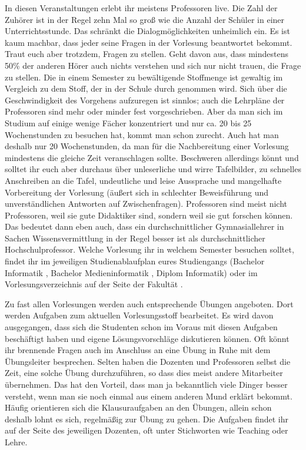 In diesen Veranstaltungen erlebt ihr meistens Professoren live.
Die Zahl der Zuhörer ist in der Regel zehn Mal so groß wie die Anzahl der Schüler in einer Unterrichtsstunde.
Das schränkt die Dialogmöglichkeiten unheimlich ein.
Es ist kaum machbar, dass jeder seine Fragen in der Vorlesung beantwortet bekommt.
Traut euch aber trotzdem, Fragen zu stellen.
Geht davon aus, dass mindestens 50\% der anderen Hörer auch nichts verstehen und sich nur nicht trauen, die Frage zu stellen.
Die in einem Semester zu bewältigende Stoffmenge ist gewaltig im Vergleich zu dem Stoff, der in der Schule durch genommen wird.
Sich über die Geschwindigkeit des Vorgehens aufzuregen ist sinnlos; auch die Lehrpläne der Professoren sind mehr oder minder fest vorgeschrieben.
Aber da man sich im Studium auf einige wenige Fächer konzentriert und nur ca. 20 bis 25 Wochenstunden zu besuchen hat, kommt man schon zurecht.
Auch hat man deshalb nur 20 Wochenstunden, da man für die Nachbereitung einer Vorlesung mindestens die gleiche Zeit veranschlagen sollte.
Beschweren allerdings könnt und solltet ihr euch aber durchaus über unleserliche und wirre Tafelbilder, zu schnelles Anschreiben an die Tafel, undeutliche und leise Aussprache und mangelhafte Vorbereitung der Vorlesung (äußert sich in schlechter Beweisführung und unverständlichen Antworten auf Zwischenfragen).
Professoren sind meist nicht Professoren, weil sie gute Didaktiker sind, sondern weil sie gut forschen können.
Das bedeutet dann eben auch, dass ein durchschnittlicher Gymnasiallehrer in Sachen Wissensvermittlung in der Regel besser ist als durchschnittlicher Hochschulprofessor.
Welche Vorlesung ihr in welchem Semester besuchen solltet, findet ihr im jeweiligen Studienablaufplan eures Studiengangs (Bachelor Informatik \link{\textcolor{red}{NONE}}, Bachelor Medieninformatik \link{\textcolor{red}{NONE}}, Diplom Informatik\link{\textcolor{red}{NONE}}) oder im Vorlesungsverzeichnis auf der Seite der Fakultät \link{\textcolor{red}{NONE}}.


Zu fast allen Vorlesungen werden auch entsprechende Übungen angeboten.
Dort werden Aufgaben zum aktuellen Vorlesungsstoff bearbeitet.
Es wird davon ausgegangen, dass sich die Studenten schon im Voraus mit diesen Aufgaben beschäftigt haben und eigene Lösungsvorschläge diskutieren können.
Oft könnt ihr brennende Fragen auch im Anschluss an eine Übung in Ruhe mit dem Übungsleiter besprechen.
Selten haben die Dozenten und Professoren selbst die Zeit, eine solche Übung durchzuführen, so dass dies meist andere Mitarbeiter übernehmen.
Das hat den Vorteil, dass man ja bekanntlich viele Dinger besser versteht, wenn man sie noch einmal aus einem anderen Mund erklärt bekommt.
Häufig orientieren sich die Klausuraufgaben an den Übungen, allein schon deshalb lohnt es sich, regelmäßig zur Übung zu gehen.
Die Aufgaben findet ihr auf der Seite des jeweiligen Dozenten, oft unter Stichworten wie Teaching oder Lehre.

